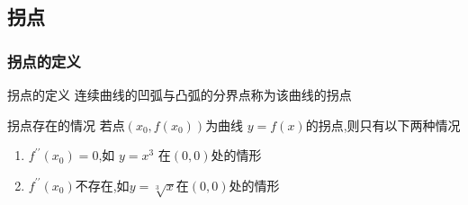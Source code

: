 \documentclass[8pt a4paper, oneside, UTF8]{ctexbook}  %
\begin{document}
\begin{sloppypar}
    \subsection{拐点}
    \subsubsection{拐点的定义}
    \begin{defn}{拐点的定义}{}
        连续曲线的凹弧与凸弧的分界点称为该曲线的拐点
    \end{defn}
    \begin{criterion}{拐点存在的情况}{}
        若点$(x_0,f(x_0))$为曲线 $y=f(x)$的拐点,则只有以下两种情况
        \begin{enumerate}
            \item $f^{\prime\prime}\left(x_{0}\right)=0$,如 $y=x^{3}$ 在$\left(0,0\right)$处的情形
            \item $f^{\prime\prime}(x_0)$不存在,如$y=\sqrt[3]{x}$在$(0,0)$处的情形
        \end{enumerate}
    \end{criterion}

\end{sloppypar}
\end{document}
